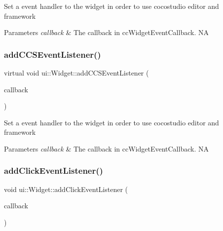 Set a event handler to the widget in order to use cocostudio editor and framework 
\begin{DoxyParams}{Parameters}
{\em callback} & The callback in {\ttfamily cc\+Widget\+Event\+Callback}.  NA \\
\hline
\end{DoxyParams}
\mbox{\label{classui_1_1Widget_adaea987f471ffaa56f1749befd7135b8}} 
\subsubsection{\texorpdfstring{add\+C\+C\+S\+Event\+Listener()}{addCCSEventListener()}\hspace{0.1cm}{\footnotesize\ttfamily [2/2]}}
{\footnotesize\ttfamily virtual void ui\+::\+Widget\+::add\+C\+C\+S\+Event\+Listener (\begin{DoxyParamCaption}\item[{const \hyperlink{classui_1_1Widget_a15b83a56c3c29442ec103100b45e56c7}{cc\+Widget\+Event\+Callback} \&}]{callback }\end{DoxyParamCaption})\hspace{0.3cm}{\ttfamily [virtual]}}

Set a event handler to the widget in order to use cocostudio editor and framework 
\begin{DoxyParams}{Parameters}
{\em callback} & The callback in {\ttfamily cc\+Widget\+Event\+Callback}.  NA \\
\hline
\end{DoxyParams}
\mbox{\label{classui_1_1Widget_a840938728aeeca3152490620ab1952d1}} 
\subsubsection{\texorpdfstring{add\+Click\+Event\+Listener()}{addClickEventListener()}\hspace{0.1cm}{\footnotesize\ttfamily [1/2]}}
{\footnotesize\ttfamily void ui\+::\+Widget\+::add\+Click\+Event\+Listener (\begin{DoxyParamCaption}\item[{const \hyperlink{classui_1_1Widget_a01110bd071334e41c48ee0bec593db61}{cc\+Widget\+Click\+Callback} \&}]{callback }\end{DoxyParamCaption})}

